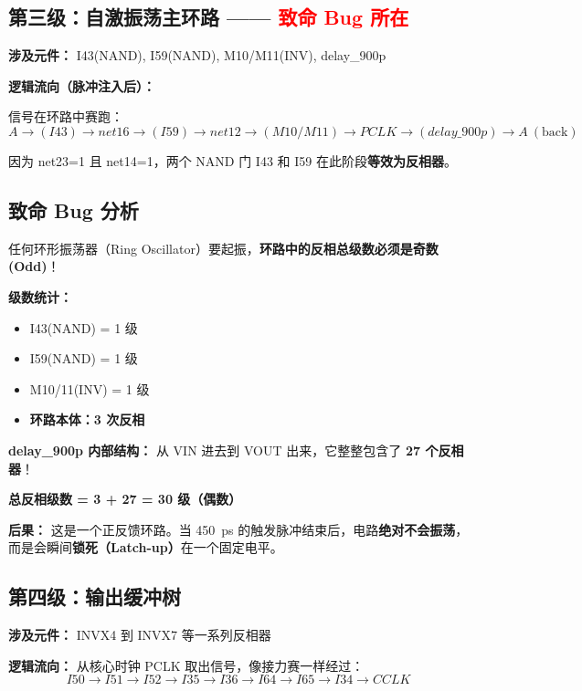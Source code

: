 \documentclass[11pt,a4paper,UTF8]{ctexart}
\begin{document}
\subsection{第三级：自激振荡主环路 —— \textcolor{red}{\textbf{致命 Bug 所在}}}

\textbf{涉及元件：} I43(NAND), I59(NAND), M10/M11(INV), delay\_900p

\textbf{逻辑流向（脉冲注入后）：}

信号在环路中赛跑：
\[
A \rightarrow (I43) \rightarrow net16 \rightarrow (I59) \rightarrow net12 \rightarrow (M10/M11) \rightarrow PCLK \rightarrow (delay\_900p) \rightarrow A~(\text{back})
\]

因为 net23=1 且 net14=1，两个 NAND 门 I43 和 I59 在此阶段\textbf{等效为反相器}。

\subsection{\textbf{致命 Bug 分析}}

\begin{tcolorbox}[colback=red!5!white,colframe=red!75!black,title=\textbf{致命 Bug 分析}]
任何环形振荡器（Ring Oscillator）要起振，\textbf{环路中的反相总级数必须是奇数 (Odd)}！

\textbf{级数统计：}
\begin{itemize}
    \item I43(NAND) = 1 级
    \item I59(NAND) = 1 级
    \item M10/11(INV) = 1 级
    \item \textbf{环路本体：3 次反相}
\end{itemize}

\textbf{delay\_900p 内部结构：} 从 VIN 进去到 VOUT 出来，它整整包含了 \textbf{27 个反相器}！

\textbf{总反相级数 = 3 + 27 = 30 级（偶数）}

\textbf{后果：} 这是一个正反馈环路。当 \SI{450}{ps} 的触发脉冲结束后，电路\textbf{绝对不会振荡}，而是会瞬间\textbf{锁死（Latch-up）}在一个固定电平。
\end{tcolorbox}

\subsection{第四级：输出缓冲树}

\textbf{涉及元件：} INVX4 到 INVX7 等一系列反相器

\textbf{逻辑流向：} 从核心时钟 PCLK 取出信号，像接力赛一样经过：
\[
I50 \rightarrow I51 \rightarrow I52 \rightarrow I35 \rightarrow I36 \rightarrow I64 \rightarrow I65 \rightarrow I34 \rightarrow CCLK
\]
\end{document}
